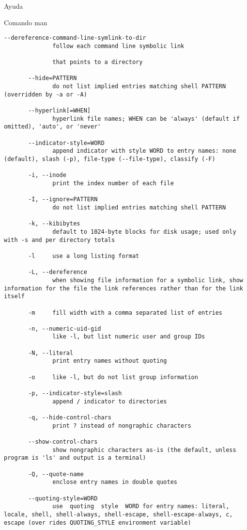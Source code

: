 \begin{section}{Ayuda}
\begin{subsection}{Comando man}
\begin{lstlisting}[style=Ubuntu]
       --dereference-command-line-symlink-to-dir
              follow each command line symbolic link

              that points to a directory

       --hide=PATTERN
              do not list implied entries matching shell PATTERN (overridden by -a or -A)

       --hyperlink[=WHEN]
              hyperlink file names; WHEN can be 'always' (default if omitted), 'auto', or 'never'

       --indicator-style=WORD
              append indicator with style WORD to entry names: none (default), slash (-p), file-type (--file-type), classify (-F)

       -i, --inode
              print the index number of each file

       -I, --ignore=PATTERN
              do not list implied entries matching shell PATTERN

       -k, --kibibytes
              default to 1024-byte blocks for disk usage; used only with -s and per directory totals

       -l     use a long listing format

       -L, --dereference
              when showing file information for a symbolic link, show information for the file the link references rather than for the link itself

       -m     fill width with a comma separated list of entries

       -n, --numeric-uid-gid
              like -l, but list numeric user and group IDs

       -N, --literal
              print entry names without quoting

       -o     like -l, but do not list group information

       -p, --indicator-style=slash
              append / indicator to directories

       -q, --hide-control-chars
              print ? instead of nongraphic characters

       --show-control-chars
              show nongraphic characters as-is (the default, unless program is 'ls' and output is a terminal)

       -Q, --quote-name
              enclose entry names in double quotes

       --quoting-style=WORD
              use  quoting  style  WORD for entry names: literal, locale, shell, shell-always, shell-escape, shell-escape-always, c, escape (over rides QUOTING_STYLE environment variable) 


\end{lstlisting}
\end{subsection}
\end{section}
